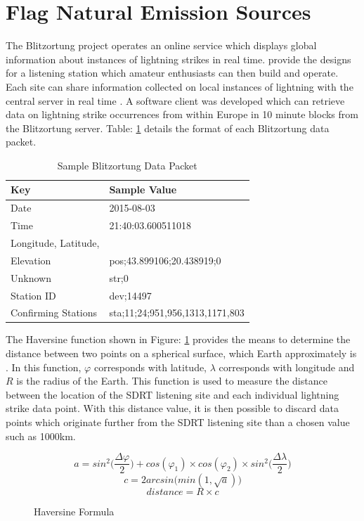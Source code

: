 \documentclass[runningheads,a4paper]{llncs}
\begin{document}
\section*{Flag Natural Emission Sources}
The Blitzortung project operates an online service which displays global information about instances of lightning strikes in real time. \cite{blitzortung-14} provide the designs for a listening station which amateur enthusiasts can then build and operate. Each site can share information collected on local instances of lightning with the central server in real time \citep{blitzortung-14}. A software client was developed which can retrieve data on lightning strike occurrences from within Europe in 10 minute blocks from the Blitzortung server. Table: \ref{tab:blitzortung_data_packet} details the format of each Blitzortung data packet.

%
\begin{table}
	\centering
	\begin{tabular}{p{4cm} l}
		\toprule
		Key & Sample Value\\ \midrule
		Date & 2015-08-03 \\
		Time & 21:40:03.600511018 \\
		Longitude, Latitude, \\Elevation & pos;43.899106;20.438919;0 \\
		Unknown & str;0 \\
		Station ID & dev;14497 \\
		Confirming Stations &  sta;11;24;951,956,1313,1171,803 \\
		\bottomrule
	\end{tabular}
	\caption{Sample Blitzortung Data Packet}
	\label{tab:blitzortung_data_packet}
\end{table}
%

The Haversine function shown in Figure: \ref{fig:haversine_formula} provides the means to determine the distance between two points on a spherical surface, which Earth approximately is \citep{pineda-krch-10}. In this function, $\varphi$ corresponds with latitude, $\lambda$ corresponds with longitude and $R$ is the radius of the Earth. This function is used to measure the distance between the location of the SDRT listening site and each individual lightning strike data point. With this distance value, it is then possible to discard data points which originate further from the SDRT listening site than a chosen value such as 1000km.

%
\begin{figure}[here]
	\centering
	\begin{equation}
		a = sin^2\big(\frac{\Delta \varphi}{2}\big) + cos(\varphi_1) \times cos(\varphi_2) \times sin^2\big(\frac{\Delta \lambda}{2}\big)
	\end{equation}
	\begin{equation}
		c = 2arcsin\big(min(1,\sqrt{a})\big)
	\end{equation}
	\begin{equation}
		distance = R \times c
	\end{equation}
	\caption{Haversine Formula}
	\label{fig:haversine_formula}
\end{figure}
%
\end{document}
